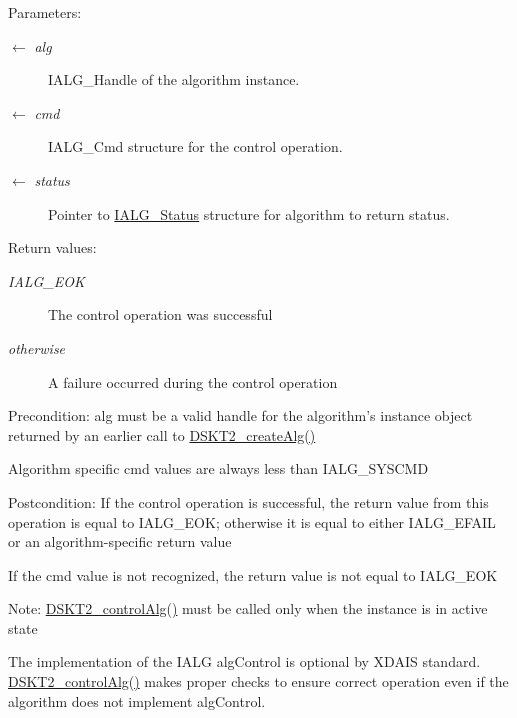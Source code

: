 \begin{Desc}
\item[Parameters:]
\begin{description}
\item[\mbox{$\leftarrow$} {\em alg}]IALG\_\-Handle of the algorithm instance. \item[\mbox{$\leftarrow$} {\em cmd}]IALG\_\-Cmd structure for the control operation. \item[\mbox{$\leftarrow$} {\em status}]Pointer to \hyperlink{struct_i_a_l_g___status}{IALG\_\-Status} structure for algorithm to return status.\end{description}
\end{Desc}
\begin{Desc}
\item[Return values:]
\begin{description}
\item[{\em IALG\_\-EOK}]The control operation was successful \item[{\em otherwise}]A failure occurred during the control operation\end{description}
\end{Desc}
\begin{Desc}
\item[Precondition:]alg must be a valid handle for the algorithm's instance object returned by an earlier call to \hyperlink{group___d_s_p_d_s_k_t2_g5528d73c34724bc310404da0dc2fbd69}{DSKT2\_\-create\-Alg()}

Algorithm specific cmd values are always less than IALG\_\-SYSCMD\end{Desc}
\begin{Desc}
\item[Postcondition:]If the control operation is successful, the return value from this operation is equal to IALG\_\-EOK; otherwise it is equal to either IALG\_\-EFAIL or an algorithm-specific return value

If the cmd value is not recognized, the return value is not equal to IALG\_\-EOK\end{Desc}
\begin{Desc}
\item[Note:]\hyperlink{group___d_s_p_d_s_k_t2_g65d8c7ae9d40adcda0c92a9e51c6fd0b}{DSKT2\_\-control\-Alg()} must be called only when the instance is in active state

The implementation of the IALG alg\-Control is optional by XDAIS standard. \hyperlink{group___d_s_p_d_s_k_t2_g65d8c7ae9d40adcda0c92a9e51c6fd0b}{DSKT2\_\-control\-Alg()} makes proper checks to ensure correct operation even if the algorithm does not implement alg\-Control. \end{Desc}
